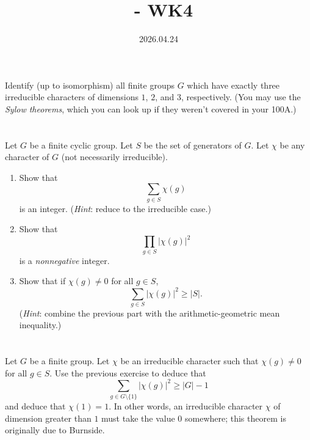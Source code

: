 \documentclass[12pt]{article}
\title{\course\ - WK4}
\author{\myname}
\date{2026.04.24}
\begin{document}
\maketitle
\thispagestyle{fancy}


\section{}
Identify (up to isomorphism) all finite groups $G$ which have exactly three irreducible
characters of dimensions $1$, $2$, and $3$, respectively.
(You may use the \textit{Sylow theorems}, which you can look up if they weren't covered
in your 100A.)
 
\section{}
Let $G$ be a finite cyclic group. Let $S$ be the set of generators of $G$. Let $\chi$ be
any character of $G$ (not necessarily irreducible).
 
\begin{enumerate}
    \item Show that
    \[
        \sum_{g \in S} \chi(g)
    \]
    is an integer. (\textit{Hint}: reduce to the irreducible case.)
 
    \item Show that
    \[
        \prod_{g \in S} |\chi(g)|^{2}
    \]
    is a \emph{nonnegative} integer.
 
    \item Show that if $\chi(g) \neq 0$ for all $g \in S$,
    \[
        \sum_{g \in S} |\chi(g)|^{2} \geq |S|.
    \]
    (\textit{Hint}: combine the previous part with the arithmetic-geometric mean
    inequality.)
\end{enumerate}
 
\section{}
Let $G$ be a finite group. Let $\chi$ be an irreducible character such that
$\chi(g) \neq 0$ for all $g \in S$. Use the previous exercise to deduce that
\[
    \sum_{g \in G \setminus \{1\}} |\chi(g)|^{2} \geq |G| - 1
\]
and deduce that $\chi(1) = 1$. In other words, an irreducible character $\chi$ of
dimension greater than $1$ must take the value $0$ somewhere; this theorem is originally
due to Burnside.
 
\end{document}
